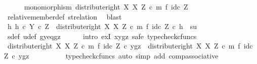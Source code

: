 \begin{isabellebody}
\ \ \ \ \isamarkupfalse%
\ {\isachardoublequoteopen}monomorphism\ {\isacharparenleft}{\kern0pt}distribute{\isacharunderscore}{\kern0pt}right\ X\ X\ Z\ {\isasymcirc}\isactrlsub c\ m\ {\isasymtimes}\isactrlsub f\ id\isactrlsub c\ Z{\isacharparenright}{\kern0pt}{\isachardoublequoteclose}\isanewline
\ \ \ \ \ \ \isamarkupfalse%
\ relative{\isacharunderscore}{\kern0pt}member{\isacharunderscore}{\kern0pt}def{}\ st{\isacharunderscore}{\kern0pt}relation\ \isamarkupfalse%
\ blast\isanewline
\isanewline
\ \ \ \ \isamarkupfalse%
\ {\isachardoublequoteopen}{\isasymexists}h{\isachardot}{\kern0pt}\ h\ {\isasymin}\isactrlsub c\ Y\ {\isasymtimes}\isactrlsub c\ Z\ {\isasymand}\ {\isacharparenleft}{\kern0pt}distribute{\isacharunderscore}{\kern0pt}right\ X\ X\ Z\ {\isasymcirc}\isactrlsub c\ m\ {\isasymtimes}\isactrlsub f\ id\isactrlsub c\ Z{\isacharparenright}{\kern0pt}\ {\isasymcirc}\isactrlsub c\ h\ {\isacharequal}{\kern0pt}\ {\isasymlangle}s{\isacharcomma}{\kern0pt}u{\isasymrangle}{\isachardoublequoteclose}\isanewline
\ \ \ \ \ \ \isamarkupfalse%
\ s{\isacharunderscore}{\kern0pt}def\ u{\isacharunderscore}{\kern0pt}def\ gy{\isacharunderscore}{\kern0pt}eq{\isacharunderscore}{\kern0pt}gz\isanewline
\ \ \ \ \isamarkupfalse%
\ {\isacharparenleft}{\kern0pt}intro\ exI{\isacharbrackleft}{\kern0pt}\ x{\isacharequal}{\kern0pt}{\isachardoublequoteopen}{\isasymlangle}y{\isacharcomma}{\kern0pt}gz{\isasymrangle}{\isachardoublequoteclose}{\isacharbrackright}{\kern0pt}{\isacharcomma}{\kern0pt}\ safe{\isacharcomma}{\kern0pt}\ typecheck{\isacharunderscore}{\kern0pt}cfuncs{\isacharparenright}{\kern0pt}\isanewline
\ \ \ \ \ \ \isamarkupfalse%
\ {\isachardoublequoteopen}{\isacharparenleft}{\kern0pt}distribute{\isacharunderscore}{\kern0pt}right\ X\ X\ Z\ {\isasymcirc}\isactrlsub c\ m\ {\isasymtimes}\isactrlsub f\ id\isactrlsub c\ Z{\isacharparenright}{\kern0pt}\ {\isasymcirc}\isactrlsub c\ {\isasymlangle}y{\isacharcomma}{\kern0pt}gz{\isasymrangle}\ {\isacharequal}{\kern0pt}\ distribute{\isacharunderscore}{\kern0pt}right\ X\ X\ Z\ {\isasymcirc}\isactrlsub c\ {\isacharparenleft}{\kern0pt}m\ {\isasymtimes}\isactrlsub f\ id\isactrlsub c\ Z{\isacharparenright}{\kern0pt}\ {\isasymcirc}\isactrlsub c\ {\isasymlangle}y{\isacharcomma}{\kern0pt}gz{\isasymrangle}{\isachardoublequoteclose}\isanewline
\ \ \ \ \ \ \ \ \isamarkupfalse%
\ {\isacharparenleft}{\kern0pt}typecheck{\isacharunderscore}{\kern0pt}cfuncs{\isacharcomma}{\kern0pt}\ auto\ simp\ add{\isacharcolon}{\kern0pt}\ comp{\isacharunderscore}{\kern0pt}associative{}{\isacharparenright}{\kern0pt}\isanewline

\end{isabellebody}
